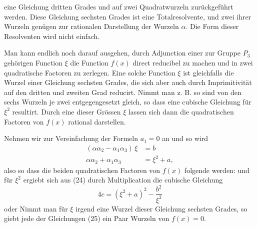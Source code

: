
eine Gleichung dritten Grades und auf zwei Quadratwurzeln
zurückgeführt werden. Diese Gleichung sechsten Grades ist eine
Totalresolvente, und zwei ihrer Wurzeln genügen zur rationalen
Darstellung der Wurzeln $\alpha$. Die Form dieser Resolventen wird
nicht einfach.

Man kann endlich noch darauf ausgehen, durch Adjunction
einer zur Gruppe $P_3$ gehörigen Function $\xi$ die Function $f(x)$
direct reducibel zu machen und in zwei quadratische Factoren
zu zerlegen. Eine solche Function $\xi$ ist gleichfalls die Wurzel
einer Gleichung sechsten Grades, die sich aber auch durch Imprimitivität
 auf den dritten und zweiten Grad reducirt. Nimmt
man z. B.
so sind von den sechs Wurzeln je zwei entgegengesetzt gleich,
so dass eine cubische Gleichung für $\xi^2$ resultirt. Durch eine
dieser Grössen $\xi$ lassen sich dann die quadratischen Factoren
von $f(x)$ rational darstellen.

Nehmen wir zur Vereinfachung der Formeln $a_1 = 0$ an und
so wird
\[
\begin{aligned}
(\alpha\alpha_2 - \alpha_1\alpha_3)\,\xi &= b \\
\alpha\alpha_2 + \alpha_1\alpha_3 &= \xi^2 + a,
\end{aligned}
\]
also
so dass die beiden quadratischen Factoren von $f(x)$ folgende werden:
und für $\xi^2$ ergiebt sich aus (24) durch Multiplication die cubische
Gleichung
\[
4c = (\xi^2 + a)^2 - \frac{b^2}{\xi^2}
\]
oder
Nimmt man für $\xi$ irgend eine Wurzel dieser Gleichung
sechsten Grades, so giebt jede der Gleichungen (25) ein Paar
Wurzeln von $f(x) = 0$.
